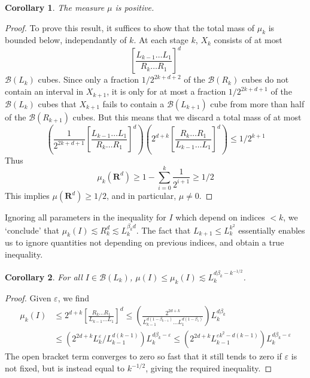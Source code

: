 \documentclass{article}
\theoremstyle{plain}
\newtheorem*{corollary}{Corollary}
\theoremstyle{plain}
\begin{document}
\begin{corollary}
	The measure $\mu$ is positive.
\end{corollary}
\begin{proof}
	To prove this result, it suffices to show that the total mass of $\mu_k$ is bounded below, independantly of $k$. At each stage $k$, $X_k$ consists of at most
	\[ \left[ \frac{L_{k-1} \dots L_1}{R_k \dots R_1} \right]^d \]
	$\mathcal{B}(L_k)$ cubes. Since only a fraction $1/2^{2k+d+2}$ of the $\mathcal{B}(R_k)$ cubes do not contain an interval in $X_{k+1}$, it is only for at most a fraction $1/2^{2k+d+1}$ of the $\mathcal{B}(L_k)$ cubes that $X_{k+1}$ fails to contain a $\mathcal{B}(L_{k+1})$ cube from more than half of the $\mathcal{B}(R_{k+1})$ cubes. But this means that we discard a total mass of at most
	\[ \left( \frac{1}{2^{2k + d + 1}} \left[ \frac{L_{k-1} \dots L_1}{R_k \dots R_1} \right]^d \right) \left( 2^{d+k} \left[ \frac{R_k \dots R_1}{L_{k-1} \dots L_1} \right]^d \right) \leq 1/2^{k+1} \]
	Thus
	\[ \mu_k(\mathbf{R}^d) \geq 1 - \sum_{i = 0}^k \frac{1}{2^{i+1}} \geq 1/2 \]
	This implies $\mu(\mathbf{R}^d) \geq 1/2$, and in particular, $\mu \neq 0$.
\end{proof}

Ignoring all parameters in the inequality for $I$ which depend on indices $< k$, we `conclude' that $\mu_k(I) \lesssim R_k^d \lesssim L_k^{\beta_k d}$. The fact that $L_{k+1} \leq L_k^{k^2}$ essentially enables us to ignore quantities not depending on previous indices, and obtain a true inequality.

\begin{corollary}
	For all $I \in \mathcal{B}(L_k)$, $\mu(I) \leq \mu_k(I) \lesssim L_k^{d \beta_k - k^{-1/2}}$.
\end{corollary}
\begin{proof}
	Given $\varepsilon$, we find
	\begin{align*}
		\mu_k(I) &\leq 2^{d + k} \left[ \frac{R_k \dots R_1}{L_{k-1} \dots L_1} \right]^d \leq \left( \frac{2^{2d + k}}{L_{k-1}^{d(1 - \beta_{k-1})} \dots L_1^{d(1 - \beta_1)}} \right) L_k^{d \beta_k}\\
		&\leq \left( 2^{2d + k} L_k^\varepsilon / L_{k-1}^{d(k-1)} \right) L_k^{d \beta_k - \varepsilon} \leq \left( 2^{2d + k} L_{k-1}^{\varepsilon k^2 - d(k - 1)} \right) L_k^{d \beta_k - \varepsilon}
	\end{align*}
	The open bracket term converges to zero so fast that it still tends to zero if $\varepsilon$ is not fixed, but is instead equal to $k^{-1/2}$, giving the required inequality.
\end{proof}
\end{document}
